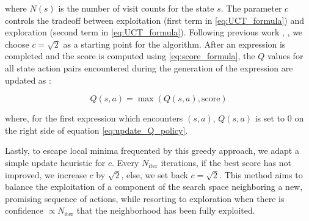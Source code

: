 \documentclass[12pt]{iopart}
\begin{document}
where $N(s)$ is the number of visit counts for the state $s$. The parameter $c$ controls the tradeoff between exploitation (first term in \ref{eq:UCT_formula}) and exploration (second term in \ref{eq:UCT_formula}). Following previous work \cite{Swiechowski2023} \cite{Auer2002}, \cite{kuleshov2014algorithms} \cite{10.1007/11871842_29}, we choose $c = \sqrt{2}$ as a starting point for the algorithm. After an expression is completed and the score is computed using \ref{eq:score_formula}, the $Q$ values for all state action pairs encountered during the generation of the expression are updated as \cite{sun2023symbolic}:

\begin{equation}
Q(s,a) = \max{\left(Q(s,a), \mathrm{score}\right)} \label{eq:update_Q_policy}
\end{equation}

where, for the first expression which encounters $(s,a)$, $Q(s,a)$ is set to 0 on the right side of equation \ref{eq:update_Q_policy}. 
\par Lastly, to escape local minima frequented by this greedy approach, we adapt a simple update heuristic for $c$.  Every $N_{\mathrm{iter}}$ iterations, if the best score has not improved, we increase $c$ by $\sqrt{2}$, else, we set back $c = \sqrt{2}$. This method aims to balance the exploitation of a component of the search space neighboring a new, promising sequence of actions, while resorting to exploration when there is confidence $\propto N_{\mathrm{iter}}$ that the neighborhood has been fully exploited.
\end{document}
